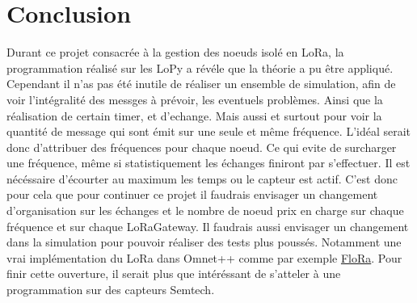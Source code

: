\documentclass[11pt]{article}
\begin{document}
\section{Conclusion}
Durant ce projet consacrée à la gestion des noeuds isolé en LoRa, la programmation réalisé sur les LoPy a révéle que la théorie a pu être appliqué. Cependant il n'as pas été inutile de réaliser un ensemble de simulation, afin de voir l'intégralité des messges à prévoir, les eventuels problèmes. Ainsi que la réalisation de certain timer, et d'echange. Mais aussi et surtout pour voir la quantité de message qui sont émit sur une seule et même fréquence. L'idéal serait donc d'attribuer des fréquences pour chaque noeud. Ce qui evite de surcharger une fréquence, même si statistiquement les échanges finiront par s'effectuer. Il est nécéssaire d'écourter au maximum les temps ou le capteur est actif. C'est donc pour cela que pour continuer ce projet il faudrais envisager un changement d'organisation sur les échanges et le nombre de noeud prix en charge sur chaque fréquence et sur chaque LoRaGateway. Il faudrais aussi envisager un changement dans la simulation pour pouvoir réaliser des tests plus poussés. Notamment une vrai implémentation du LoRa dans Omnet++ comme par exemple \href{http://flora.aalto.fi}{FloRa}. Pour finir cette ouverture, il serait plus que intéréssant de s'atteler à une programmation sur des capteurs Semtech. 
\newpage
\listoffigures
\newpage
\listofalgorithms
{}
\newpage
\end{document}
